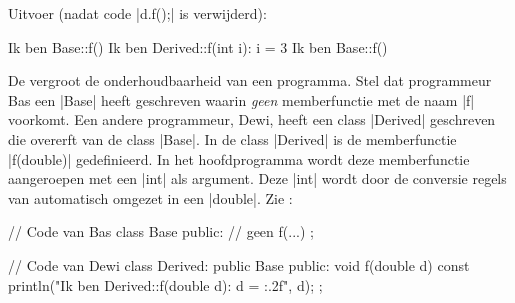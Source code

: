 \begin{cpplstShortInline}
\addtocounter{footnote}{-2}
\makeatletter\let\Hy@footnote@currentHref\saved@Href@P\makeatother 
\addtocounter{BackrefHyperFootnoteCounter}{-2}
\xdef\BackrefFootnoteTag{bhfn:\theBackrefHyperFootnoteCounter}
\makeatletter\let\Hy@footnote@currentHref\saved@Href@Q\makeatother
{}
\xdef\BackrefFootnoteTag{bhfn:\theBackrefHyperFootnoteCounter}
\makeatletter\let\Hy@footnote@currentHref\saved@Href@R\makeatother
{}
\xdef\BackrefFootnoteTag{bhfn:\theBackrefHyperFootnoteCounter}

Uitvoer (nadat code |d.f();| is verwijderd):
\begin{coutput}
Ik ben Base::f()
Ik ben Derived::f(int i): i = 3
Ik ben Base::f()
\end{coutput}

De  vergroot de onderhoudbaarheid van een programma.
Stel dat programmeur Bas een  |Base| heeft geschreven waarin \emph{geen} memberfunctie met de naam |f| voorkomt.
Een andere programmeur, Dewi, heeft een class |Derived| geschreven die overerft van de class |Base|.
In de class |Derived| is de memberfunctie |f(double)| gedefinieerd.
In het hoofdprogramma wordt deze memberfunctie aangeroepen met een |int| als argument.
Deze |int| wordt door de conversie regels van \Cpp{} automatisch omgezet in een |double|. Zie :

\begin{cpplstfragment}
// Code van Bas
class Base {
public:
    // geen f(...)
};

// Code van Dewi
class Derived: public Base {
public:
    void f(double d) const {
        println("Ik ben Derived::f(double d): d = {:.2f}", d);
    }
};


\end{cpplstfragment}
\end{cpplstShortInline}
